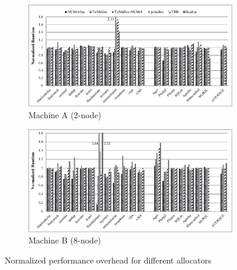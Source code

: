 


\begin{figure}[H]
    \centering
    \begin{subfigure}{0.9\textwidth}
    \includegraphics[width=\textwidth]{figure/2-node-parsec-perf.pdf}
    \caption{Machine A (2-node)\label{2node-parsec-perf}}
    \end{subfigure}
    
	\vspace{0.1in}  
	
	\begin{subfigure}{0.9\textwidth}    \includegraphics[width=\textwidth]{figure/8-node-parsec-perf.pdf}
    \caption{Machine B (8-node)\label{8node-parsec-perf}}
    \end{subfigure}
    \caption{Normalized performance overhead for different allocators \label{sec:perf}}
 \end{figure}


